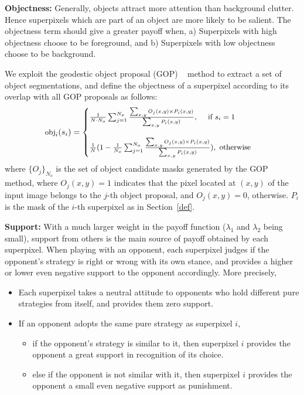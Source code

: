 \documentclass[journal]{IEEEtran}
\begin{document}
\noindent \textbf{Objectness:} Generally, objects attract more attention than background clutter. Hence superpixels which are part of an object are more likely to be salient. The objectness term should give a greater payoff when, a) Superpixels with high objectness choose to be foreground, and b) Superpixels with low objectness choose to be background.

We exploit the geodestic object proposal (GOP) ~\cite{Kr2014Geodesic} method to extract a set of object segmentations, and define the objectness of a superpixel according to its overlap with all GOP proposals as follows: 
\begin{equation}
\setlength{\abovedisplayskip}{2pt}
\setlength{\belowdisplayskip}{2pt}
\small
\label{obj}
\mbox{obj}_i(s_i)=
\begin{cases}
\frac{1}{N \cdot N_o} \sum_{j=1}^{N_o} \frac{\sum_{x, y} O_j(x,y) \times P_i(x,y)}{\sum_{x,y} P_i(x,y)}, ~~~~\mbox{if}~s_i = 1 \\ \\
\frac{1}{N} (1 - \frac{1}{N_o} \sum_{j=1}^{N_o} \frac{\sum_{x, y} O_j(x,y) \times P_i(x,y)}{\sum_{x,y} P_i(x,y)}),~\mbox{otherwise}
\end{cases}
\end{equation}
where $\{O_j\}_{N_o}$ is the set of object candidate masks generated by the GOP method, where $O_j(x, y) = 1$ indicates that the pixel located at $(x, y)$ of the input image belongs to the $j$-th object proposal, and $O_j(x, y) = 0$, otherwise. ${P_i}$ is the mask of the $i$-th superpixel as in Section~\ref{def}. 

\noindent \textbf{Support:} With a much larger weight in the payoff function ($\lambda_1$ and $\lambda_2$ being small), support from others is the main source of payoff obtained by each superpixel. When playing with an opponent, each superpixel judges if the opponent's strategy is right or wrong with its own stance, and provides a higher or lower even negative support to the opponent accordingly. More precisely,
\begin{itemize}
   \item Each superpixel takes a neutral attitude to opponents who hold different pure strategies from itself, and provides them zero support.
   \item If an opponent adopts the same pure strategy as superpixel $i$, 
   \begin{itemize}
      \item if the opponent's strategy is similar to it, then superpixel $i$ provides the opponent a great support in recognition of its choice. 
      \item else if the opponent is not similar with it, then superpixel $i$ provides the opponent a small even negative support as punishment.
   \end{itemize}
\end{itemize}
\end{document}
